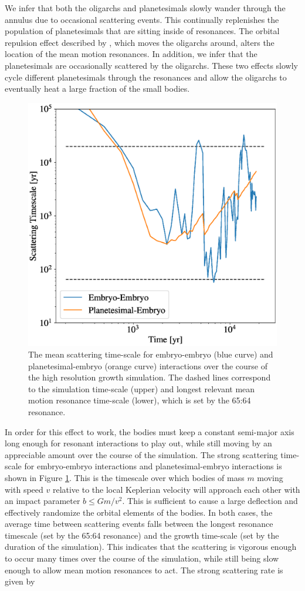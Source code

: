 We infer that both the oligarchs and planetesimals slowly wander through the annulus due to occasional scattering events. This 
continually replenishes the population of planetesimals that are sitting inside of resonances. The orbital repulsion effect 
described by \cite{kokubo98}, which moves the oligarchs around, alters the location of the mean motion resonances. 
In addition, we infer that the planetesimals are occasionally scattered by the oligarchs. These two effects slowly cycle different 
planetesimals through the resonances and allow the oligarchs to eventually heat a large fraction of the small bodies.

\begin{figure}
    \begin{centering}
    \includegraphics[width=0.5\columnwidth]{figures/plSS/scatter_timescale.eps}
    \caption{The mean scattering time-scale for embryo-embryo (blue curve) and planetesimal-embryo (orange curve) interactions 
    over the course of the high resolution growth simulation. The dashed lines correspond to the simulation time-scale (upper) and 
    longest relevant mean motion resonance time-scale (lower), which is set by the 65:64 resonance.}
    \label{fig:scatter_timescale}
    \end{centering}
\end{figure}

In order for this effect to work, the bodies must keep a constant semi-major axis long enough for resonant interactions to play 
out, while still moving by an appreciable amount over the course of the simulation. The strong scattering time-scale for embryo-embryo interactions and planetesimal-embryo interactions is shown in Figure \ref{fig:scatter_timescale}. This is the timescale 
over which bodies of mass $m$ moving with speed $v$ relative to the local Keplerian velocity will approach each other with an 
impact parameter $b \leq G m / v^{2}$. This is sufficient to cause a large deflection and effectively randomize the orbital 
elements of the bodies. In both cases, the average time between scattering events falls between the longest resonance timescale (set by the 65:64 resonance) and the growth time-scale (set by the duration of the simulation). This indicates that the 
scattering is vigorous enough to occur many times over the course of the simulation, while still being slow enough to allow mean 
motion resonances to act. The strong scattering rate is given by

